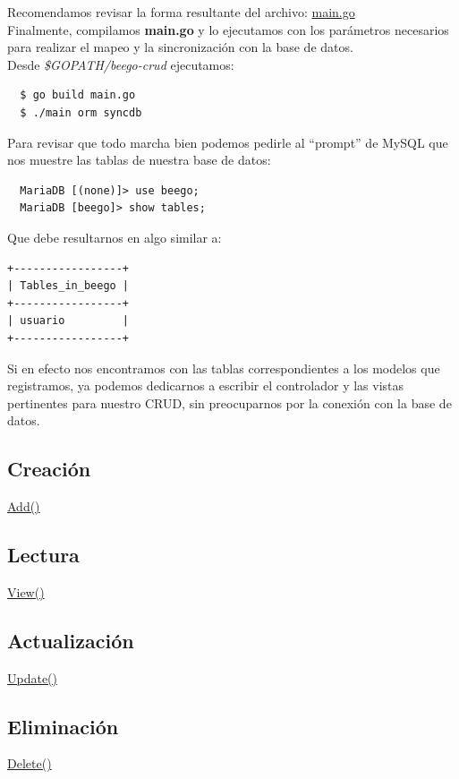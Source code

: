 \documentclass[12pt]{article}
\begin{document}
\noindent
Recomendamos revisar la forma resultante del archivo: \href{https://github.com/Kihui/Beego-CRUD/blob/master/main.go}{main.go} \\

Finalmente, compilamos \textbf{main.go} y lo ejecutamos con los parámetros necesarios
para realizar el mapeo y la sincronización con la base de datos.\\

\noindent
Desde \textit{\$GOPATH/beego-crud} ejecutamos:
\begin{verbatim}
  $ go build main.go
  $ ./main orm syncdb
\end{verbatim}

\noindent
Para revisar que todo marcha bien podemos pedirle al ``prompt'' de MySQL que nos
muestre las tablas de nuestra base de datos:
\begin{verbatim}
  MariaDB [(none)]> use beego;
  MariaDB [beego]> show tables;
\end{verbatim}

\noindent
Que debe resultarnos en algo similar a:
\begin{verbatim}
+-----------------+
| Tables_in_beego |
+-----------------+
| usuario         |
+-----------------+
\end{verbatim}

Si en efecto nos encontramos con las tablas correspondientes a los modelos que
registramos, ya podemos dedicarnos a escribir el controlador y las vistas
pertinentes para nuestro CRUD, sin preocuparnos por la conexión con la base
de datos.
\subsection{Creación}
\href{https://github.com/Kihui/Beego-CRUD/blob/master/controllers/default.go\#L29}{Add()}
\subsection{Lectura}
\href{https://github.com/Kihui/Beego-CRUD/blob/master/controllers/default.go\#L15}{View()}
\subsection{Actualización}
\href{https://github.com/Kihui/Beego-CRUD/blob/master/controllers/default.go\#L94}{Update()}
\subsection{Eliminación}
\href{https://github.com/Kihui/Beego-CRUD/blob/master/controllers/default.go\#L64}{Delete()}
\end{document}
